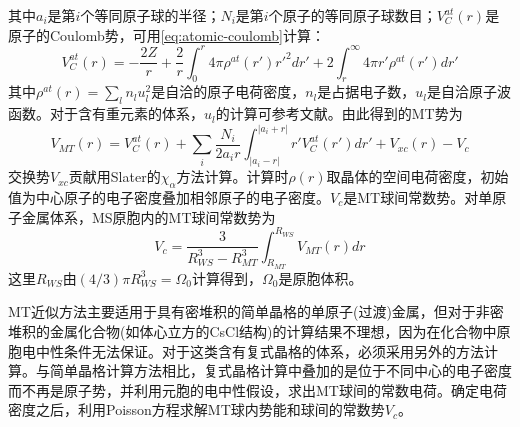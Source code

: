 其中$a_i$是第$i$个等同原子球的半径；$N_i$是第$i$个原子的等同原子球数目；$V_C^{at}(r)$是原子的Coulomb势，可用\eqref{eq:atomic-coulomb}计算：
\begin{equation}
  V_C^{at}(r)=-\dfrac{2Z}r+\frac2r\int_0^r4\pi\rho^{at}(r')r'^2dr'+2\int_r^{\infty}4\pi r'\rho^{at}(r')dr'
  \label{eq:atomic-coulomb}
\end{equation}
其中$\rho^{at}(r)=\sum\limits_l n_lu_l^2$是自洽的原子电荷密度，$n_l$是占据电子数，$u_l$是自洽原子波函数\cite{Herman-Skillman}。对于含有重元素的体系，$u_l$的计算可参考文献\cite{PR137-23_1965}。由此得到的MT势为
\begin{equation}
  V_{MT}(r)=V_C^{at}(r)+\sum_i\dfrac{N_i}{2a_ir}\int_{|a_i-r|}^{|a_i+r|}r'V_C^{at}(r')dr'+V_{xc}(r)-V_c
  \label{eq:potential-MT}
\end{equation}
交换势$V_{xc}$贡献用Slater的$\chi_{\alpha}$方法计算\cite{PR81-385_1951}。计算时$\rho(r)$取晶体的空间电荷密度，初始值为中心原子的电子密度叠加相邻原子的电子密度。$V_c$是MT球间常数势。对单原子金属体系，MS原胞内的MT球间常数势为
\begin{equation}
  V_c=\dfrac3{R_{WS}^3-R_{MT}^3}\int_{R_{MT}}^{R_{WS}}V_{MT}(r)dr
  \label{eq:monoatomic-ini}
\end{equation}
这里$R_{WS}$由$(4/3)\pi R_{WS}^3=\Omega_0$计算得到，$\Omega_0$是原胞体积。

MT近似方法主要适用于具有密堆积的简单晶格的单原子(过渡)金属\cite{SSP26-104_1971}，但对于非密堆积的金属化合物(如体心立方的CsCl结构)\cite{PRB13-5362_1976}的计算结果不理想，因为在化合物中原胞电中性条件无法保证。对于这类含有复式晶格的体系，必须采用另外的方法计算\cite{PSSB36-447_1969}。与简单晶格计算方法相比，复式晶格计算中叠加的是位于不同中心的电子密度而不再是原子势，并利用元胞的电中性假设，求出MT球间的常数电荷。确定电荷密度之后，利用Poisson方程求解MT球内势能和球间的常数势$V_c$。

